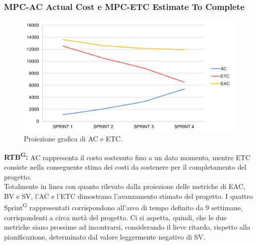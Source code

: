 \documentclass[8pt]{article}
\newcommand{\glossterm}[1]{#1\textsuperscript{G}} %
\begin{document}
\subsubsection{MPC-AC Actual Cost e MPC-ETC Estimate To Complete}
\begin{figure}[h!]
    \centering
    \includegraphics[width=1\textwidth]{images_pdq/ETC_AC.png}
    \caption{Proiezione grafica di AC e ETC.}
    \label{fig:Proiezione grafica di AC e ETC}
\end{figure}
\textbf{\glossterm{RTB}:} AC rappresenta il costo sostenuto fino a un dato momento, mentre ETC consiste nella conseguente stima dei costi da sostenere per il completamento del progetto.\\
Totalmente in linea con quanto rilevato dalla proiezione delle metriche di EAC, BV e SV, l'AC e l'ETC dimostrano l'avanzamento stimato del progetto. I quattro \glossterm{Sprint} rappresentati corrispondono all'arco di tempo definito da 9 settimane, corrispondenti a circa metà del progetto. Ci si aspetta, quindi, che le due metriche siano prossime ad incontrarsi, considerando il lieve ritardo, rispetto alla pianificazione, determinato dal valore leggermente negativo di SV.
\clearpage
\end{document}
